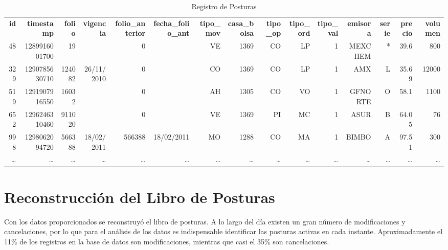 \documentclass[10pt]{article}
\begin{document}
\begin{landscape}
\begin{table}[htbp]\scriptsize
  \centering
  \caption{ Registro de Posturas}
 \setlength\tabcolsep{1.5pt}
  \begin{tabular}{rrrrrrrrrrrrrrr}
   \textbf{ id}    & \textbf{timestamp} & \textbf{folio} & \textbf{vigencia} & \textbf{folio\_anterior} & \textbf{fecha\_folio\_ant} & \textbf{tipo\_mov} & \textbf{casa\_bolsa} & \textbf{tipo\_op} & \textbf{tipo\_ord} & \textbf{tipo\_val} & \textbf{emisora} & \textbf{serie} & \textbf{precio} & \textbf{volumen} \\
    48 & 1289916001700 & 19    &       & 0     &       & VE    & 1369  & CO    & LP    & 1     & MEXCHEM & *     & 39.6  & 800 \\
    329 & 1290785630710 & 124082 & 26/11/2010 & 0     &       & CO    & 1369  & CO    & LP    & 1     & AMX   & L     & 35.69 & 12000 \\
    519 & 1291907916550 & 16032 &       & 0     &       & AH    & 1305  & CO    & VO    & 1     & GFNORTE & O     & 58.1  & 1100 \\
    652 & 1296246310460 & 911020 &       & 0     &       & VE    & 1369  & PI    & MC    & 1     & ASUR  & B     & 64.05 & 76 \\
    998 & 1298062094720 & 566388 & 18/02/2011 & 566388 & 18/02/2011 & MO    & 1288  & CO    & MA    & 1     & BIMBO & A     & 97.51 & 300 \\
    \ldots & \ldots & \ldots & \ldots & \ldots & \ldots & \ldots & \ldots & \ldots & \ldots & \ldots & \ldots & \ldots & \ldots & \ldots \\
    \end{tabular}%
  \label{tab:regposturasl}%
\end{table}%

\end{landscape}

\clearpage

\section{Reconstrucción del Libro de Posturas}

Con los datos proporcionados se reconstruyó el libro de posturas. A lo largo del día existen un gran número de modificaciones y cancelaciones, por lo que para el análisis de los datos es indispensable identificar las posturas activas en cada instante. Aproximadamente el 11\% de los registros en la base de datos son modificaciones, mientras que casi el 35\% son cancelaciones.\\
\end{document}
